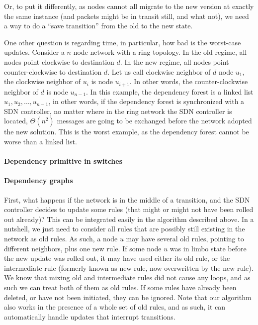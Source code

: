 Or, to put it differently, as nodes cannot all migrate to the new version at exactly the same instance (and packets might be in transit still, and what not), we need a way to do a ``save transition'' from the old to the new state.

One other question is regarding time, in particular, how bad is the worst-case updates. Consider a $n$-node network with a ring topology. In the old regime, all nodes point clockwise to destination $d$. In the new regime, all nodes point counter-clockwise to destination $d$. Let us call clockwise neighbor of $d$ node $u_1$, the clockwise neighbor of $u_i$ is node $u_{i+1}$. In other words, the counter-clockwise neighbor of $d$ is node $u_{n-1}$. In this example, the dependency forest is a linked list $u_1,u_2,\ldots,u_{n-1}$, in other words, if the dependency forest is synchronized with a SDN controller, no matter where in the ring network the SDN controller is located, $\Theta(n^2)$ messages are going to be exchanged before the network adopted the new solution. This is the worst example, as the dependency forest cannot be worse than a linked list.

\paragraph{Dependency primitive in switches}

\paragraph{Dependency graphs}

First, what happens if the network is in the middle of a transition, and the SDN controller decides to update some rules (that might or might not have been rolled out already)? This can be integrated easily in the algorithm described above. In a nutshell, we just need to consider all rules that are possibly still existing in the network as old rules. As such, a node $u$ may have several old rules, pointing to different neighbors, plus one new rule. If some node $u$ was in limbo state before the new update was rolled out, it may have used either its old rule, or the intermediate rule (formerly known as new rule, now overwritten by the new rule). We know that mixing old and intermediate rules did not cause any loops, and as such we can treat both of them as old rules. If some rules have already been deleted, or have not been initiated, they can be ignored. Note that our algorithm also works in the presence of a whole set of old rules, and as such, it can automatically handle updates that interrupt transitions.

